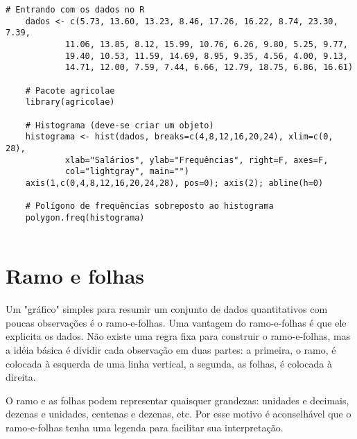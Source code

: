 \documentclass[11pt,fleqn]{book} %
\begin{document}
\begin{scriptsize}
	\estiloR
	\begin{lstlisting}[caption={Comandos do software R}, label=lst:Rgraf6.2]
	# Entrando com os dados no R
	dados <- c(5.73, 13.60, 13.23, 8.46, 17.26, 16.22, 8.74, 23.30, 7.39,
			11.06, 13.85, 8.12, 15.99, 10.76, 6.26, 9.80, 5.25, 9.77,
			19.40, 10.53, 11.59, 14.69, 8.95, 9.35, 4.56, 4.00, 9.13,
			14.71, 12.00, 7.59, 7.44, 6.66, 12.79, 18.75, 6.86, 16.61)
	 	
	# Pacote agricolae
	library(agricolae)
	
	# Histograma (deve-se criar um objeto)
	histograma <- hist(dados, breaks=c(4,8,12,16,20,24), xlim=c(0, 28), 
			xlab="Salários", ylab="Frequências", right=F, axes=F, 
			col="lightgray", main="") 
	axis(1,c(0,4,8,12,16,20,24,28), pos=0); axis(2); abline(h=0)
	
	# Polígono de frequências sobreposto ao histograma
	polygon.freq(histograma)	


	\end{lstlisting}
\end{scriptsize}






\section{Ramo e folhas}

Um "gráfico" simples para resumir um conjunto de dados quantitativos com poucas observações é o ramo-e-folhas. Uma vantagem do ramo-e-folhas é que ele explicita os dados.
Não existe uma regra fixa para construir o ramo-e-folhas, mas a idéia básica é dividir cada observação em duas partes: a primeira, o ramo, é colocada à esquerda de uma linha vertical, a segunda, as folhas, é colocada à direita. 

O ramo e as folhas podem representar quaisquer grandezas: unidades e decimais, dezenas e unidades, centenas e dezenas, etc. Por esse motivo é aconselhável que o ramo-e-folhas tenha uma legenda para facilitar sua interpretação. \\
\end{document}
